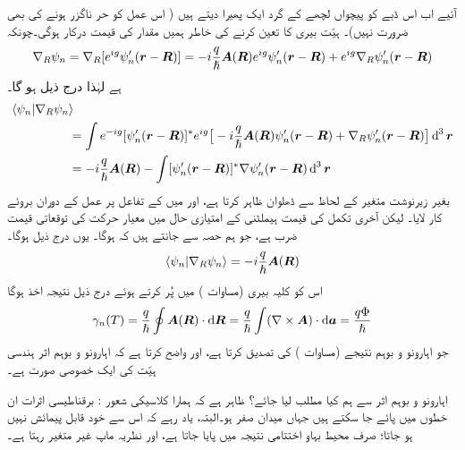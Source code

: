  آئیے اب اس ڈبے کو  پیچواں لچھے کے گرد ایک پھیرا دیتے ہیں  ( اس عمل  کو حر ناگزر ہونے کی  بھی ضرورت نہیں)۔ ہیّت بیری کا  تعین کرنے کی خاطر ہمیں
  مقدار  کی قیمت درکار ہوگی۔چونکہ 
\begin{align*}
\nabla_R \psi_n = \nabla_R [e^{i g} \psi'_n ({{\boldsymbol{r}}} - {{\boldsymbol{R}}})] = -i \frac{q}{\hslash} {{\boldsymbol{A}}} ({{\boldsymbol{R}}}) e^{i g} \psi'_n ({{\boldsymbol{r}}} - {{\boldsymbol{R}}}) + e^{i g} \nabla_R \psi'_n ({{\boldsymbol{r}}} - {{\boldsymbol{R}}})
\end{align*}
ہے لہٰذا درج ذیل  ہو گا۔ 
\begin{align}
\langle \psi_n | \nabla_R \psi_n &\rangle \nonumber\\
&= \int e^{- i g} [\psi'_n (\kvec{r} - \kvec{R})]^{*} e^{i g} \big [ - i \frac{q}{\hslash} \kvec{A} (\kvec{R}) \psi'_n (\kvec{r} - \kvec{R}) + \nabla_R \psi'_n (\kvec{r} - \kvec{R}) \big ] \dif^{\,3} \kvec{r} \nonumber\\
&= - i \frac{q}{\hslash} \kvec{A} (\kvec{R}) - \int [\psi'_n (\kvec{r} - \kvec{R})]^{*} \nabla \psi'_n (\kvec{r} - \kvec{R}) \dif^{\,3} \kvec{r}
\end{align}
بغیر زیرنوشت  متغیر   کے لحاظ سے ڈھلوان ظاہر کرتا ہے، اور میں   کے تفاعل پر عمل کے
 دوران  بروئے کار لایا۔ لیکن  آخری تکمل کی قیمت  ہیملٹنی  کے امتیازی حال میں معیار حرکت کی توقعاتی قیمت
  ضرب   ہے،  جو ہم حصہ   سے جانتے ہیں کہ  ہوگا۔ یوں درج ذیل ہوگا۔
\begin{align}
\langle \psi_n | \nabla_R \psi_n \rangle = - i \frac{q}{\hslash} {{\boldsymbol{A}}} ({{\boldsymbol{R}}})
\end{align}
اس کو کلیہ بیری  (مساوات  )    میں پُر کرتے ہوئے درج ذیل نتیجہ  اخذ ہوگا 
\begin{align}
\gamma_n (T) = \frac{q}{\hslash} \oint \kvec{A} (\kvec{R}) \cdot \dif \kvec{R} = \frac{q}{\hslash} \int (\nabla \times \kvec{A}) \cdot \dif \kvec{a} = \frac{q \Phi}{\hslash}
\end{align}
جو اہارونو و بوہم نتیجے   (مساوات  )   کی تصدیق کرتا ہے،  اور   واضح  کرتا ہے کہ  اہارونو و بوہم اثر ہندسی ہیّت کی ایک خصوصی صورت ہے۔

اہارونو و بوہم اثر سے ہم کیا مطلب  لیا جائے؟  ظاہر ہے کہ  ہمارا کلاسیکی شعور :    برقناطیسی اثرات ان  خطوں میں پائے جا سکتے ہیں جہاں میدان صفر ہو۔البتہ، یاد  رہے کہ اس سے  خود قابل پیمائش نہیں ہو جاتا؛  صرف  محیط  بہاو   اختتامی  نتیجہ میں پایا جاتا ہے،  اور نظریہ   ماپ  غیر متغیر رہتا ہے۔

